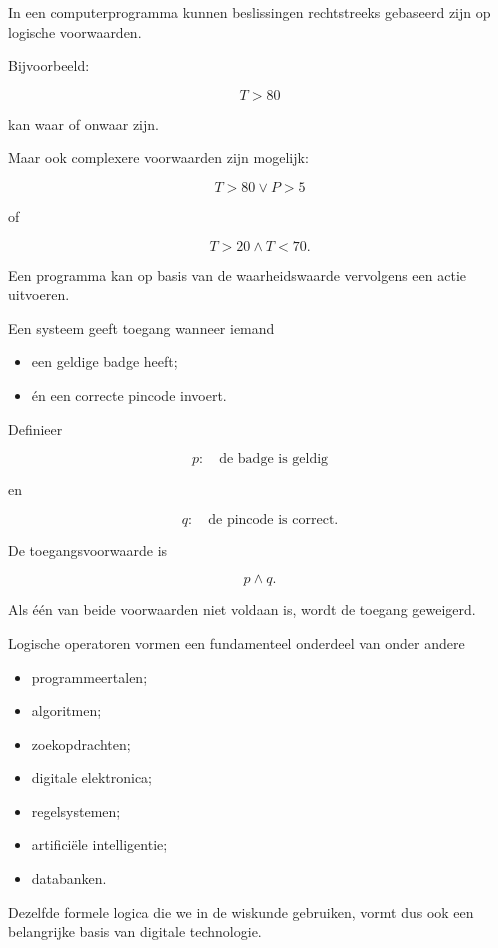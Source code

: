 \documentclass{ximera}
\begin{document}
  In een computerprogramma kunnen beslissingen rechtstreeks gebaseerd
  zijn op logische voorwaarden.

  Bijvoorbeeld:

  \[
  T>80
  \]

  kan waar of onwaar zijn.

  Maar ook complexere voorwaarden zijn mogelijk:

  \[
  T>80\lor P>5
  \]

  of

  \[
  T>20\land T<70.
  \]


  Een programma kan op basis van de waarheidswaarde vervolgens een
  actie uitvoeren.


  \begin{voorbeeld}[Toegangscontrole]

  Een systeem geeft toegang wanneer iemand

  \begin{itemize}
    \item een geldige badge heeft;
    \item én een correcte pincode invoert.
  \end{itemize}

  Definieer

  \[
  p:\quad \text{de badge is geldig}
  \]

  en

  \[
  q:\quad \text{de pincode is correct}.
  \]

  De toegangsvoorwaarde is

  \[
  p\land q.
  \]

  Als één van beide voorwaarden niet voldaan is, wordt de toegang
  geweigerd.
  \end{voorbeeld}


  \begin{opmerking}
  Logische operatoren vormen een fundamenteel onderdeel van onder andere

  \begin{itemize}
    \item programmeertalen;
    \item algoritmen;
    \item zoekopdrachten;
    \item digitale elektronica;
    \item regelsystemen;
    \item artificiële intelligentie;
    \item databanken.
  \end{itemize}

  Dezelfde formele logica die we in de wiskunde gebruiken, vormt dus
  ook een belangrijke basis van digitale technologie.
  \end{opmerking}
\end{document}
